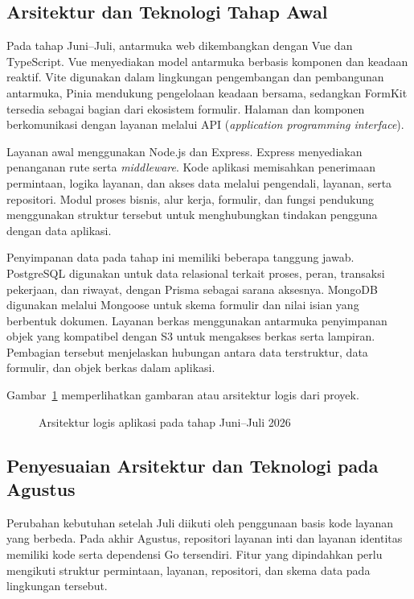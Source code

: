 \subsection{Arsitektur dan Teknologi Tahap Awal}\label{sec:lingkungan}
Pada tahap Juni--Juli, antarmuka web dikembangkan dengan Vue dan TypeScript. Vue menyediakan model antarmuka berbasis komponen dan keadaan reaktif. Vite digunakan dalam lingkungan pengembangan dan pembangunan antarmuka, Pinia mendukung pengelolaan keadaan bersama, sedangkan FormKit tersedia sebagai bagian dari ekosistem formulir. Halaman dan komponen berkomunikasi dengan layanan melalui API (\textit{application programming interface}).

Layanan awal menggunakan Node.js dan Express. Express menyediakan penanganan rute serta \textit{middleware}. Kode aplikasi memisahkan penerimaan permintaan, logika layanan, dan akses data melalui pengendali, layanan, serta repositori. Modul proses bisnis, alur kerja, formulir, dan fungsi pendukung menggunakan struktur tersebut untuk menghubungkan tindakan pengguna dengan data aplikasi.

Penyimpanan data pada tahap ini memiliki beberapa tanggung jawab. PostgreSQL digunakan untuk data relasional terkait proses, peran, transaksi pekerjaan, dan riwayat, dengan Prisma sebagai sarana aksesnya. MongoDB digunakan melalui Mongoose untuk skema formulir dan nilai isian yang berbentuk dokumen. Layanan berkas menggunakan antarmuka penyimpanan objek yang kompatibel dengan S3 untuk mengakses berkas serta lampiran. Pembagian tersebut menjelaskan hubungan antara data terstruktur, data formulir, dan objek berkas dalam aplikasi.

Gambar~\ref{fig:arsitektur} memperlihatkan gambaran atau arsitektur logis dari proyek.
\begin{figure}[htbp]
\centering

\caption{Arsitektur logis aplikasi pada tahap Juni--Juli 2026}
\label{fig:arsitektur}
\end{figure}

\subsection{Penyesuaian Arsitektur dan Teknologi pada Agustus}
Perubahan kebutuhan setelah Juli diikuti oleh penggunaan basis kode layanan yang berbeda. Pada akhir Agustus, repositori layanan inti dan layanan identitas memiliki kode serta dependensi Go tersendiri. Fitur yang dipindahkan perlu mengikuti struktur permintaan, layanan, repositori, dan skema data pada lingkungan tersebut.

